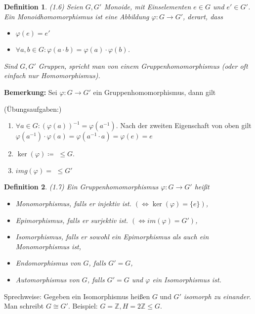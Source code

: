 \documentclass[10pt,a4paper]{article}
\newtheorem{defi}{Definition}
\begin{document}
\begin{defi} (1.6) Seien $G, G'$ Monoide, mit Einselementen $e \in G$ und $e' \in G'$. Ein \emph{Monoidhomomorphismus} ist eine Abbildung $\varphi : G \to G'$, derart, dass \begin{itemize}
\item $\varphi(e) = e'$
\item $\forall a, b \in G: \varphi(a \cdot b) = \varphi (a) \cdot \varphi (b)$.
\end{itemize}
Sind $G, G'$ Gruppen, spricht man von einem \emph{Gruppenhomomorphismus} (oder oft einfach nur Homomorphismus).
\end{defi}

\textbf{Bemerkung:} Sei $\varphi : G \to G'$ ein Gruppenhomomorphismus, dann gilt

(Übungsaufgaben:)
\begin{enumerate}
\item $\forall a \in G: (\varphi (a))^{-1} = \varphi (a^{-1})$. Nach der zweiten Eigenschaft von oben gilt $\varphi(a^{-1}) \cdot \varphi(a) = \varphi(a^{-1} \cdot a) = \varphi(e) = e$

\item $\ker (\varphi) \coloneqq$  $\leqslant G$.

\item $img (\varphi) =$   $\leqslant G'$
\end{enumerate} 

\begin{defi} (1.7) Ein Gruppenhomomorphismus $\varphi : G \to G'$ heißt
\begin{itemize}
	\item \emph{Monomorphismus}, falls er injektiv ist. $(\Leftrightarrow \ker (\varphi) = \{e\})$,
	\item \emph{Epimorphismus}, falls er surjektiv ist. $(\Leftrightarrow im(\varphi) = G')$,
	\item \emph{Isomorphismus}, falls er sowohl ein Epimorphismus als auch ein Monomorphismus ist,
	\item \emph{Endomorphismus} von $G$, falls $G' = G$,
	\item \emph{Automorphismus} von $G$, falls $G' = G$ und $\varphi$ ein Isomorphismus ist.
\end{itemize}
\end{defi}

Sprechweise: Gegeben ein Isomorphismus heißen $G$ und $G'$ \emph{isomorph zu einander}. Man schreibt $G \cong G'$. Beispiel: $G = \mathbb{Z}, H = 2 \mathbb{Z} \leqslant G$.
\end{document}
